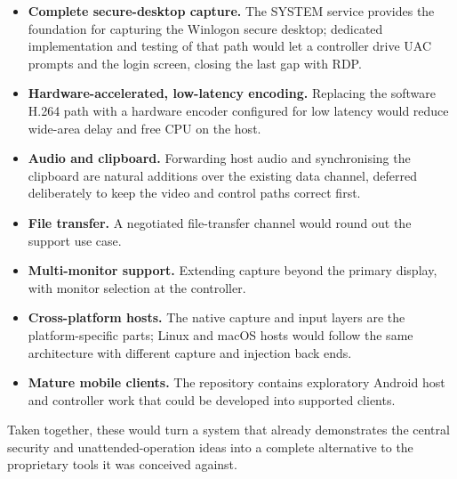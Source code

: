 \begin{itemize}
  \item \textbf{Complete secure-desktop capture.} The SYSTEM service provides the
        foundation for capturing the Winlogon secure desktop; dedicated
        implementation and testing of that path would let a controller drive UAC
        prompts and the login screen, closing the last gap with RDP.
  \item \textbf{Hardware-accelerated, low-latency encoding.} Replacing the
        software H.264 path with a hardware encoder configured for low latency
        would reduce wide-area delay and free CPU on the host.
  \item \textbf{Audio and clipboard.} Forwarding host audio and synchronising the
        clipboard are natural additions over the existing data channel, deferred
        deliberately to keep the video and control paths correct first.
  \item \textbf{File transfer.} A negotiated file-transfer channel would round out
        the support use case.
  \item \textbf{Multi-monitor support.} Extending capture beyond the primary
        display, with monitor selection at the controller.
  \item \textbf{Cross-platform hosts.} The native capture and input layers are the
        platform-specific parts; Linux and macOS hosts would follow the same
        architecture with different capture and injection back ends.
  \item \textbf{Mature mobile clients.} The repository contains exploratory
        Android host and controller work that could be developed into supported
        clients.
\end{itemize}

Taken together, these would turn a system that already demonstrates the central
security and unattended-operation ideas into a complete alternative to the
proprietary tools it was conceived against.

